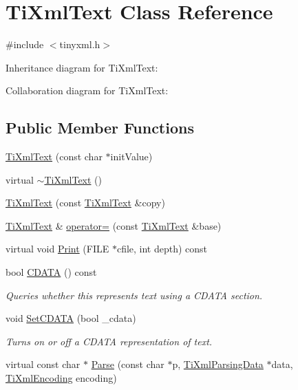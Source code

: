 \hypertarget{class_ti_xml_text}{\section{Ti\+Xml\+Text Class Reference}
\label{class_ti_xml_text}
}


{\ttfamily \#include $<$tinyxml.\+h$>$}



Inheritance diagram for Ti\+Xml\+Text\+:


Collaboration diagram for Ti\+Xml\+Text\+:
\subsection*{Public Member Functions}
\begin{DoxyCompactItemize}
\item 
\hyperlink{class_ti_xml_text_af659e77c6b87d684827f35a8f4895960}{Ti\+Xml\+Text} (const char $\ast$init\+Value)
\item 
virtual \hyperlink{class_ti_xml_text_a829a4bd2d8d2461c333eb4f3f5b1b3d2}{$\sim$\+Ti\+Xml\+Text} ()
\item 
\hyperlink{class_ti_xml_text_a8d2cc1b4af2208cbb0171cf20f6815d1}{Ti\+Xml\+Text} (const \hyperlink{class_ti_xml_text}{Ti\+Xml\+Text} \&copy)
\item 
\hyperlink{class_ti_xml_text}{Ti\+Xml\+Text} \& \hyperlink{class_ti_xml_text_aed5b13f9c1b804c616fd533882c29f57}{operator=} (const \hyperlink{class_ti_xml_text}{Ti\+Xml\+Text} \&base)
\item 
virtual void \hyperlink{class_ti_xml_text_ae74d56c5b3ddec6cc3103dd51821af92}{Print} (F\+I\+L\+E $\ast$cfile, int depth) const 
\item 
bool \hyperlink{class_ti_xml_text_ad1a6a6b83fa2271022dd97c072a2b586}{C\+D\+A\+T\+A} () const 
\begin{DoxyCompactList}\small\item\em Queries whether this represents text using a C\+D\+A\+T\+A section. \end{DoxyCompactList}\item 
void \hyperlink{class_ti_xml_text_acb17ff7c5d09b2c839393445a3de5ea9}{Set\+C\+D\+A\+T\+A} (bool \+\_\+cdata)
\begin{DoxyCompactList}\small\item\em Turns on or off a C\+D\+A\+T\+A representation of text. \end{DoxyCompactList}\item 
virtual const char $\ast$ \hyperlink{class_ti_xml_text_a8d2dcfa41fc73d3e62dacc2fcf633819}{Parse} (const char $\ast$p, \hyperlink{class_ti_xml_parsing_data}{Ti\+Xml\+Parsing\+Data} $\ast$data, \hyperlink{tinyxml_8h_a88d51847a13ee0f4b4d320d03d2c4d96}{Ti\+Xml\+Encoding} encoding)

\end{DoxyCompactItemize}
